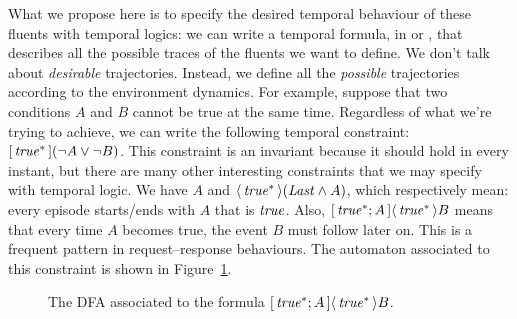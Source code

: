 What we propose here is to specify the desired temporal behaviour of these
fluents with temporal logics: we can write a temporal formula, in \ltl{} or
\ldl{}, that describes all the possible traces of the fluents we want to
define. We don't talk about \emph{desirable} trajectories. Instead, we define
all the \emph{possible} trajectories according to the environment dynamics.
For example, suppose that two conditions $A$ and $B$ cannot be true at
the same time. Regardless of what we're trying to achieve, we can write the
following temporal constraint: $[\, {\text{\textit{true}}^*} \,](\neg A \lor \neg B)$.
This constraint is an invariant because it should hold in every instant, but
there are many other interesting constraints that we may specify with temporal
logic. We have $A$ and $\langle\, {\text{\textit{true}}^*} \,\rangle(\text{\textit{Last}} \land A)$, which
respectively mean: every episode starts/ends with $A$ that is $\text{\textit{true}}$.
Also, $[\, {\text{\textit{true}}^*; A} \,]\langle\, {\text{\textit{true}}^*} \,\rangle B$ means that every time $A$ becomes
true, the event $B$ must follow later on. This is a frequent pattern in
request--response behaviours. The automaton associated to this constraint is
shown in Figure~\ref{fig:response-automa}.
\begin{figure}
		\centering
		\caption{The DFA associated to the formula ${[\, {\text{\textit{true}}^*;
			A} \,]\langle\, {\text{\textit{true}}^*} \,\rangle B}$.}
		\label{fig:response-automa}
\end{figure}


